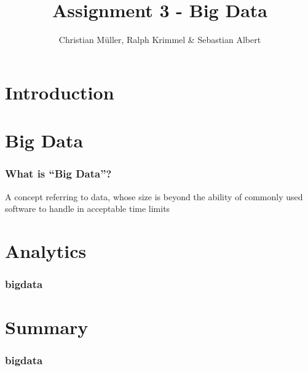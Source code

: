 \documentclass{beamer}
\title{Assignment 3 - Big Data}
\author{Christian Müller, Ralph Krimmel \& Sebastian Albert}
\begin{document}

\section{Introduction}
\begin{frame}
	\maketitle
\end{frame}

\section{Big Data}
\begin{frame}
	\frametitle{What is ``Big Data''?}
		\huge
		A concept referring to data,
		whose size is beyond the ability of commonly used software to handle in acceptable time limits
\end{frame}

\section{Analytics}
\begin{frame}
	\frametitle{bigdata}
\end{frame}

\section{Summary}
\begin{frame}
	\frametitle{bigdata}
\end{frame}
\end{document}
